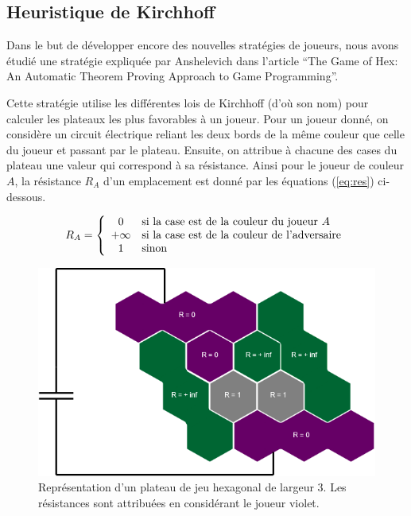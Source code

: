 \documentclass[a4paper, 12pt]{article}
\begin{document}
\subsection{Heuristique de Kirchhoff}
\label{part:kirch}
Dans le but de développer encore des nouvelles stratégies de joueurs, nous avons étudié une stratégie expliquée par Anshelevich dans l'article ``The Game of Hex: An Automatic Theorem Proving Approach to Game Programming''.

Cette stratégie utilise les différentes lois de Kirchhoff (d'où son nom) pour calculer les plateaux les plus favorables à un joueur. Pour un joueur donné, on considère un circuit électrique reliant les deux bords de la même couleur que celle du joueur et passant par le plateau. Ensuite, on attribue à chacune des cases du plateau une valeur qui correspond à sa résistance. Ainsi pour le joueur de couleur $A$, la résistance $R_A$ d'un emplacement est donné par les équations (\ref{eq:res}) ci-dessous.

\begin{equation}
  R_A = \left \{
    \begin{array}{c l}
      0 & \text{si la case est de la couleur du joueur $A$}\\
      +\infty & \text{si la case est de la couleur de l'adversaire}\\
      1 & \text{sinon}\\
    \end{array}
  \right.
  \label{eq:res}
\end{equation}

\begin{figure}[h]
  \centering
  \includegraphics[width=.8\linewidth]{./pictures/kirchoff.png}
  \caption{Représentation d'un plateau de jeu hexagonal de largeur 3. Les résistances sont attribuées en considérant le joueur violet.}
  \label{fig:kirch}
\end{figure}
\end{document}

